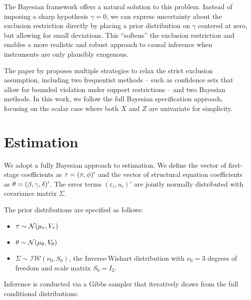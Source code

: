 The Bayesian framework offers a natural solution to this problem. Instead of imposing a sharp hypothesis $\gamma = 0$, we can express uncertainty about the exclusion restriction directly by placing a prior distribution on $\gamma$ centered at zero, but allowing for small deviations. This ``softens'' the exclusion restriction and enables a more realistic and robust approach to causal inference when instruments are only plausibly exogenous.

The paper by \cite{conleyPlausiblyExogenous2012} proposes multiple strategies to relax the strict exclusion assumption, including two frequentist methods -- such as confidence sets that allow for bounded violation under support restrictions -- and two Bayesian methods. In this work, we follow the full Bayesian specification approach, focusing on the scalar case where both \( X \) and \( Z \) are univariate for simplicity.

\section{Estimation} 

We adopt a fully Bayesian approach to estimation. We define the vector of first-stage coefficients as $\mathbf{\tau} = (\pi, \phi)'$ and the vector of structural equation coefficients as $\mathbf{\theta} = (\beta, \gamma, \delta)'$. The error terms $(\varepsilon_i, u_i)'$ are jointly normally distributed with covariance matrix $\Sigma$. 

The prior distributions are specified as follows:
\begin{itemize}
    \item $\mathbf{\tau} \sim \mathcal{N}(\mu_{\tau}, V_{\tau})$
    \item $\mathbf{\theta} \sim \mathcal{N}(\mu_{\theta}, V_{\theta})$
    \item $\Sigma \sim \mathcal{IW}(\nu_0, S_0)$, the Inverse-Wishart distribution with $\nu_0 = 3$ degrees of freedom and scale matrix $S_0 = I_2$.
\end{itemize}

Inference is conducted via a Gibbs sampler that iteratively draws from the full conditional distributions:


